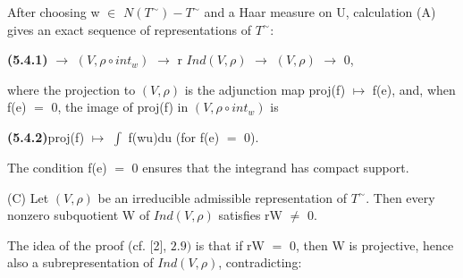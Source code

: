 \documentclass[10pt,a4paper]{article}
\begin{document}
\par After choosing w $\in{}$ $N(T^\sim)-T^\sim$ and a Haar measure on U, calculation (A) gives an exact sequence of representations of $T^\sim$:\par
\par\noindent\textbf{(5.4.1)} $\to{}$ $(V,\rho{}∘int_w)$ $\to{}$ r $Ind(V,\rho{})$ $\to{}$ $(V,\rho{})$ $\to{}$ 0,\par
\par where the projection to $(V,\rho{})$ is the adjunction map proj(f) $\mapsto{}$ f(e), and, when f(e) $=$ 0, the image of proj(f) in $(V,\rho{}∘int_w)$ is\par
\par\noindent\textbf{(5.4.2)}\quad proj(f) $\mapsto{}$ $\int{}$ f(wu)du (for f(e) $=$ 0).\par
\par The condition f(e) $=$ 0 ensures that the integrand has compact support.\par
\par (C) Let $(V,\rho{})$ be an irreducible admissible representation of $T^\sim$. Then every nonzero subquotient W of $Ind(V,\rho{})$ satisfies rW $\ne{}$ 0.\par
\par The idea of the proof (cf. [2], $2.9)$ is that if rW $=$ 0, then W is projective, hence also a subrepresentation of $Ind(V,\rho{})$, contradicting:\par
\end{document}
